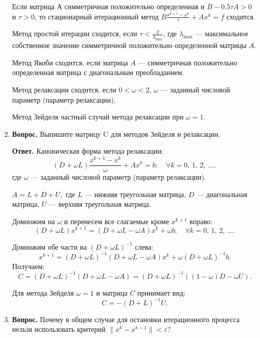 \documentclass[12pt, a4paper]{article}
\begin{document}
\begin{enumerate}
Если матрица $ А $ симметричная положительно определенная и $ B - 0.5\tau A > 0$ и $\tau > 0 $, то стационарный итерационный метод $ B \frac{x^{k + 1} - x^k}{\tau}+A x^k = f $ сходится.

Метод простой итерации сходится, если $ \tau < \frac{2}{\lambda_{\text{max}}} $, где $\lambda_{\text{max}}$ --- максимальное собственное значение симметричной положительно определенной матрицы $A$.

 Метод Якоби сходится, если матрица $A$ --- симметричная положительно определенная матрица с диагональным преобладанием.
 
 Метод релаксации сходится, если $ 0 < \omega < 2 $, $\omega$ --- заданный числовой параметр (параметр релаксации).
 
  Метод Зейделя частный случай метода релаксации при $ \omega = 1 $.
  
  	\item  \textbf{Вопрос.}	Выпишите матрицу C для методов Зейделя и релаксации.
  	
  \textbf{Ответ.}	Каноническая форма метода релаксации:
  	$$	\left( D + \omega L \right) \frac{x^{k + 1} - x^k}{\omega} + A x^k = b;\quad \forall k = 0,\, 1,\, 2,\, \dots,$$ где $\omega$ --- заданный числовой параметр (параметр релаксации).
  	
  	 $ A = L + D + U,$ где $L$ --- нижняя треугольная матрица, $D$ --- диагональная матрица, $U$ --- верхняя треугольная матрица.
  	
  	Домножим на $\omega$ и перенесем все слагаемые кроме $x^{k + 1}$ вправо:
  	$$\left( D + \omega L \right)x^{k + 1} = \left( D + \omega L -\omega A \right)x^k +\omega b; \quad \forall k = 0,\, 1,\, 2,\, \dots. $$
  	
  	Домножим обе части на $ \left( D + \omega L \right)^{-1}$ слева:
  		$$x^{k + 1} = \left( D + \omega L \right)^{-1} \left( D + \omega L -\omega A \right)x^k +\omega \left( D + \omega L \right)^{-1} b. $$
  	Получаем:
  	$$ C = \left( D + \omega L \right)^{-1} \left( D + \omega L -\omega A \right) = \left( D + \omega L \right)^{-1} \left( \left( 1 - \omega \right) D  -\omega U \right).  $$
  	
  	Для метода Зейделя $\omega = 1$ и матрица $C$ принимает вид:
  	$$ C = - \left( D + L \right)^{-1}U.  $$ 
  	
 	\item  \textbf{Вопрос.} Почему в общем случае для остановки итерационного процесса нельзя использовать критерий $\| x^k - x^{k-1} \| < \varepsilon$?
 	

\end{enumerate}
\end{document}
